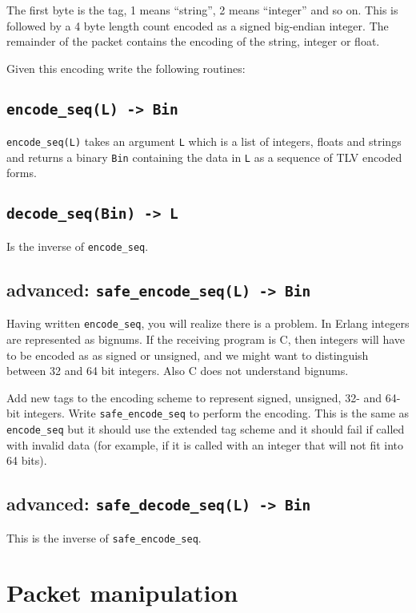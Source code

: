 ﻿\documentclass[12pt]{hitec}
\begin{document}
The first byte is the tag, 1 means ``string'', 2 means ``integer'' and
so on.  This is followed by a 4 byte length count encoded as a signed
big-endian integer. The remainder of the packet contains the encoding
of the string, integer or float.

Given this encoding write the following routines:

\subsection{\texttt{encode\_seq(L) -> Bin}}

\verb+encode_seq(L)+ takes an argument \verb+L+ which is a list of integers,
floats and strings and returns a binary \verb+Bin+ containing the
data in \verb+L+ as a sequence of  TLV encoded forms.

\subsection{\texttt{decode\_seq(Bin) -> L}}

Is the inverse of \verb+encode_seq+.


\subsection{advanced: \texttt{safe\_encode\_seq(L) -> Bin}}

Having written \verb+encode_seq+, you will realize there is a
problem. In Erlang integers are represented as bignums. If the
receiving program is C, then integers will have to be encoded as as
signed or unsigned, and we might want to distinguish between 32 and 64
bit integers. Also C does not understand bignums.

Add new tags to the encoding scheme to represent signed, unsigned, 32- and 64- bit
integers. Write \verb+safe_encode_seq+ to perform the encoding. This is the same
as \verb+encode_seq+ but it should use the extended tag scheme and it should
fail if called with invalid data (for example, if it is called with an integer
that will not fit into 64 bits).

 \subsection{advanced: \texttt{safe\_decode\_seq(L) -> Bin}}

This is the inverse of \verb+safe_encode_seq+.

\section{Packet manipulation}
\end{document}
